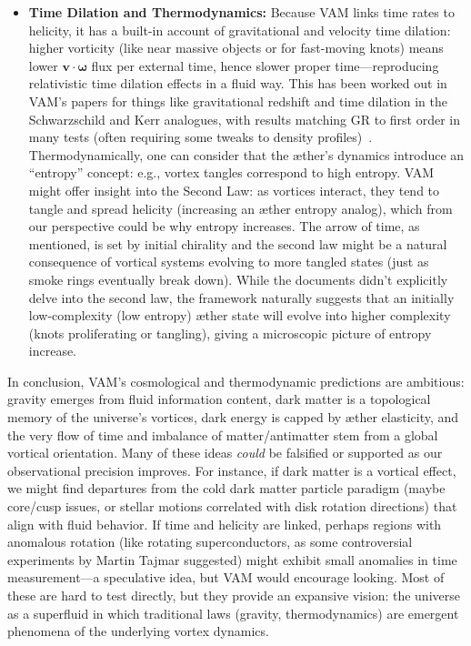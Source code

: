 \documentclass[a4paper,12pt]{article}
\begin{document}
\begin{itemize}
\item 
\textbf{Time Dilation and Thermodynamics:} Because VAM links time rates to helicity, it has a built-in account of gravitational and velocity time dilation: higher vorticity (like near massive objects or for fast-moving knots) means lower $\mathbf{v}\cdot\boldsymbol{\omega}$ flux per external time, hence slower proper time---reproducing relativistic time dilation effects in a fluid way. This has been worked out in VAM’s papers for things like gravitational redshift and time dilation in the Schwarzschild and Kerr analogues, with results matching GR to first order in many tests (often requiring some tweaks to density profiles)~\cite{vamcore}. Thermodynamically, one can consider that the æther’s dynamics introduce an “entropy” concept: e.g., vortex tangles correspond to high entropy. VAM might offer insight into the Second Law: as vortices interact, they tend to tangle and spread helicity (increasing an æther entropy analog), which from our perspective could be why entropy increases. The arrow of time, as mentioned, is set by initial chirality and the second law might be a natural consequence of vortical systems evolving to more tangled states (just as smoke rings eventually break down). While the documents didn’t explicitly delve into the second law, the framework naturally suggests that an initially low-complexity (low entropy) æther state will evolve into higher complexity (knots proliferating or tangling), giving a microscopic picture of entropy increase.

\end{itemize}

In conclusion, VAM’s cosmological and thermodynamic predictions are ambitious: gravity emerges from fluid information content, dark matter is a topological memory of the universe’s vortices, dark energy is capped by æther elasticity, and the very flow of time and imbalance of matter/antimatter stem from a global vortical orientation. Many of these ideas \textit{could} be falsified or supported as our observational precision improves. For instance, if dark matter is a vortical effect, we might find departures from the cold dark matter particle paradigm (maybe core/cusp issues, or stellar motions correlated with disk rotation directions) that align with fluid behavior. If time and helicity are linked, perhaps regions with anomalous rotation (like rotating superconductors, as some controversial experiments by Martin Tajmar suggested) might exhibit small anomalies in time measurement---a speculative idea, but VAM would encourage looking. Most of these are hard to test directly, but they provide an expansive vision: the universe as a superfluid in which traditional laws (gravity, thermodynamics) are emergent phenomena of the underlying vortex dynamics.
\end{document}
